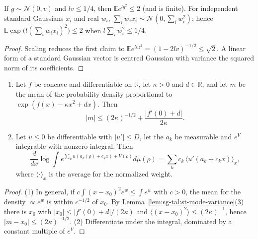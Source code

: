 \begin{lemma}\label{lem:sg-tal:st-exp-square}
  \leanok
{}
If $g\sim\mathcal N(0,v)$ and $lv\le1/4$, then $\mathbb Ee^{lg^2}\le2$ (and is finite). For independent standard
Gaussians $x_i$ and real $w_i$, $\sum_iw_ix_i\sim\mathcal N(0,\sum_iw_i^2)$; hence
$\mathbb E\exp\bigl(l(\sum_iw_ix_i)^2\bigr)\le2$ when $l\sum_iw_i^2\le1/4$.
\end{lemma}
\begin{proof}
  \leanok
Scaling reduces the first claim to $\mathbb Ee^{lvz^2}=(1-2lv)^{-1/2}\le\sqrt2$. A linear form of a standard
Gaussian vector is centred Gaussian with variance the squared norm of its coefficients.
\end{proof}

\begin{lemma}
\label{lem:sg-tal:st-mean-mode}
  \leanok
\begin{enumerate}
\item Let $f$ be concave and differentiable on $\mathbb R$, let $\kappa>0$ and $d\in\mathbb R$, and let $m$
be the mean of the probability density proportional to $\exp(f(x)-\kappa x^2+dx)$. Then
\[
|m|\le(2\kappa)^{-1/2}+\frac{|f'(0)+d|}{2\kappa}.
\]
\item Let $u\le0$ be differentiable with $|u'|\le D$, let the $a_k$ be measurable and $e^{V}$ integrable with
nonzero integral. Then
\[
\frac d{dx}\log\int e^{\sum_ku(a_k(\rho)+c_kx)+V(\rho)}d\mu(\rho)=\sum_kc_k\,\bigl\langle u'(a_k+c_kx)\bigr\rangle_x,
\]
where $\langle\cdot\rangle_x$ is the average for the normalized weight.
\end{enumerate}
\end{lemma}
\begin{proof}
  \leanok
(1) In general, if $c\int(x-x_0)^2e^{w}\le\int e^{w}$ with $c>0$, the mean for the density $\propto e^{w}$ is
within $c^{-1/2}$ of $x_0$. By Lemma~\ref{lem:sg-tal:st-mode-variance}(3) there is $x_0$ with $|x_0|\le|f'(0)+d|/(2\kappa)$ and
$\langle(x-x_0)^2\rangle\le(2\kappa)^{-1}$, hence $|m-x_0|\le(2\kappa)^{-1/2}$.
(2) Differentiate under the integral, dominated by a constant multiple of $e^V$.
\end{proof}

